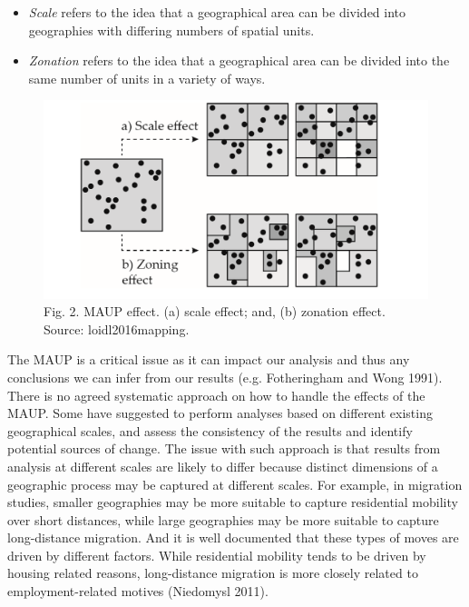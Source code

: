 \documentclass[
  letterpaper,
  DIV=11,
  numbers=noendperiod]{scrreprt}
\begin{document}
\begin{itemize}
\item
  \emph{Scale} refers to the idea that a geographical area can be
  divided into geographies with differing numbers of spatial units.
\item
  \emph{Zonation} refers to the idea that a geographical area can be
  divided into the same number of units in a variety of ways.
\end{itemize}

\begin{figure}

{\centering \includegraphics{./figs/ch1/maup.png}

}

\caption{Fig. 2. MAUP effect. (a) scale effect; and, (b) zonation
effect. Source: loidl2016mapping.}

\end{figure}

The MAUP is a critical issue as it can impact our analysis and thus any
conclusions we can infer from our results (e.g. Fotheringham and Wong
1991). There is no agreed systematic approach on how to handle the
effects of the MAUP. Some have suggested to perform analyses based on
different existing geographical scales, and assess the consistency of
the results and identify potential sources of change. The issue with
such approach is that results from analysis at different scales are
likely to differ because distinct dimensions of a geographic process may
be captured at different scales. For example, in migration studies,
smaller geographies may be more suitable to capture residential mobility
over short distances, while large geographies may be more suitable to
capture long-distance migration. And it is well documented that these
types of moves are driven by different factors. While residential
mobility tends to be driven by housing related reasons, long-distance
migration is more closely related to employment-related motives
(Niedomysl 2011).
\end{document}
